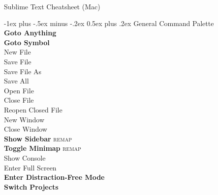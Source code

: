 \documentclass[10pt,landscape]{article}
\makeatletter
\renewcommand{\section}{\@startsection{section}{1}{0mm}%
                                {-1ex plus -.5ex minus -.2ex}%
                                {0.5ex plus .2ex}%
                                {\normalfont\large\bfseries}}
\makeatother
\begin{document}
\raggedright
\footnotesize
\begin{multicols}{3}

\setlength{\premulticols}{1pt}
\setlength{\postmulticols}{1pt}
\setlength{\multicolsep}{1pt}
\setlength{\columnsep}{2pt}

\begin{center}
     \large{Sublime Text Cheatsheet (Mac)}
\end{center}

\vspace*{-\baselineskip}
\section{General}
 Command Palette \\
 \textbf{Goto Anything} \\
 \textbf{Goto Symbol} \\
 New File \\
 Save File \\
 Save File As \\
 Save All \\
 Open File \\
 Close File \\
 Reopen Closed File \\
 New Window \\
 Close Window \\
 \textbf{Show Sidebar} \textsc{remap} \\
 \textbf{Toggle Minimap} \textsc{remap} \\
 Show Console \\
 Enter Full Screen \\
 \textbf{Enter Distraction-Free Mode} \\
 \textbf{Switch Projects}


\end{multicols}
\end{document}
